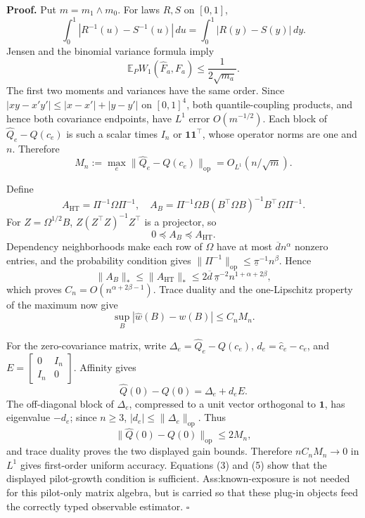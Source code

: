 \textbf{Proof.}
Put \(m=m_1\wedge m_0\).  For laws \(R,S\) on \([0,1]\),
\[
\int_0^1|R^{-1}(u)-S^{-1}(u)|\,du
=\int_0^1|R(y)-S(y)|\,dy.
\tag{1}
\]
Jensen and the binomial variance formula imply
\[
\mathbb E_PW_1(\widehat F_a,F_a)
\le\frac{1}{2\sqrt{m_a}}.
\tag{2}
\]
The first two moments and variances have the same order.  Since \(|xy-x'y'|\le|x-x'|+|y-y'|\) on \([0,1]^4\), both quantile-coupling products, and hence both covariance endpoints, have \(L^1\) error \(O(m^{-1/2})\).  Each block of \(\widehat Q_e-Q(c_e)\) is such a scalar times \(I_n\) or \(\mathbf1\mathbf1^\top\), whose operator norms are one and \(n\).  Therefore
\[
M_n:=\max_e\lVert\widehat Q_e-Q(c_e)\rVert_{\mathrm{op}}
=O_{L^1}(n/\sqrt m).
\tag{3}
\]

Define
\[
A_{\mathrm{HT}}=\Pi^{-1}\Omega\Pi^{-1},
\quad
A_B=\Pi^{-1}\Omega B(B^\top\Omega B)^{-1}B^\top\Omega\Pi^{-1}.
\]
For \(Z=\Omega^{1/2}B\), \(Z(Z^\top Z)^{-1}Z^\top\) is a projector, so
\[
0\preceq A_B\preceq A_{\mathrm{HT}}.
\tag{4}
\]
Dependency neighborhoods make each row of \(\Omega\) have at most \(\overline d n^\alpha\) nonzero entries, and the probability condition gives \(\lVert\Pi^{-1}\rVert_{\mathrm{op}}\le\underline\pi^{-1}n^\beta\).  Hence
\[
\lVert A_B\rVert_*\le\lVert A_{\mathrm{HT}}\rVert_*
\le2\overline d\,\underline\pi^{-2}n^{1+\alpha+2\beta},
\tag{5}
\]
which proves \(C_n=O(n^{\alpha+2\beta-1})\).  Trace duality and the one-Lipschitz property of the maximum now give
\[
\sup_B|\widehat w(B)-w(B)|\le C_nM_n.
\tag{6}
\]

For the zero-covariance matrix, write \(\Delta_e=\widehat Q_e-Q(c_e)\), \(d_e=\widehat c_e-c_e\), and \(E=\begin{bmatrix}0&I_n\\I_n&0\end{bmatrix}\).  Affinity gives
\[
\widehat Q(0)-Q(0)=\Delta_e+d_eE.
\tag{7}
\]
The off-diagonal block of \(\Delta_e\), compressed to a unit vector orthogonal to \(\mathbf1\), has eigenvalue \(-d_e\); since \(n\ge3\), \(|d_e|\le\lVert\Delta_e\rVert_{\mathrm{op}}\).  Thus
\[
\lVert\widehat Q(0)-Q(0)\rVert_{\mathrm{op}}\le2M_n,
\]
and trace duality proves the two displayed gain bounds.  Therefore \(nC_nM_n\to0\) in \(L^1\) gives first-order uniform accuracy.  Equations (3) and (5) show that the displayed pilot-growth condition is sufficient.  Ass:known-exposure is not needed for this pilot-only matrix algebra, but is carried so that these plug-in objects feed the correctly typed observable estimator. \(\square\)